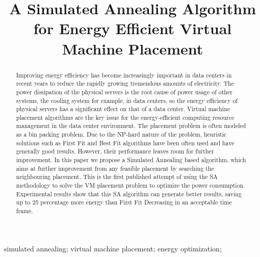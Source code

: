 \documentclass[10pt, conference, compsocconf]{IEEEtran}
\begin{document}
\setcounter{page}{1}
\pagestyle{plain}

\title{A Simulated Annealing Algorithm for Energy Efficient Virtual Machine Placement}



\author{ 
}


\maketitle


\begin{abstract}
Improving energy efficiency has become increasingly important in data centers in
recent years to reduce the rapidly growing tremendous amounts of electricity.
The power dissipation of the physical servers is the root cause of power usage
of other systems, the cooling system for example, in data centers, so the energy
efficiency of physical servers has a significant effect on that of a data center.
Virtual machine placement algorithms are the key issue for the energy-efficient
computing resource management in the data center environment. The placement
problem is often modeled as a bin packing problem.
Due to the NP-hard nature of the problem, heuristic solutions such as First Fit
and Best Fit algorithms have been often used and have generally good results.
However, their performance leaves room for further improvement. In this paper we
propose a Simulated Annealing based algorithm, which aims at further improvement
from any feasible placement by searching the neighbouring placement. This is the
first published attempt of using the SA methodology to solve the VM placement
problem to optimize the power consumption.
Experimental results show that this SA algorithm can generate better results,
saving up to 25 percentage more energy than First Fit Decreasing in an
acceptable time frame.
\end{abstract}

\begin{IEEEkeywords}
simulated annealing; virtual machine placement; energy optimization;

\end{IEEEkeywords}
\end{document}
